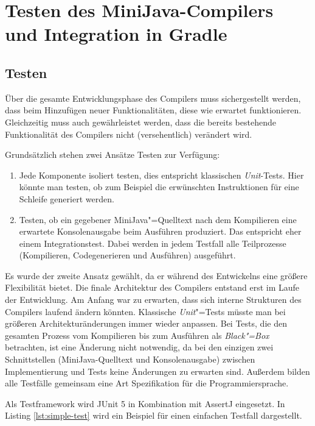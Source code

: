 \chapter{Testen des MiniJava-Compilers und Integration in Gradle}
\label{cha:Testen-des-Compilers}

\section{Testen}

Über die gesamte Entwicklungsphase des Compilers muss sichergestellt werden, dass beim Hinzufügen neuer Funktionalitäten, diese wie erwartet funktionieren. Gleichzeitig muss auch gewährleistet werden, dass die bereits bestehende Funktionalität des Compilers nicht (versehentlich) verändert wird.

Grundsätzlich stehen zwei Ansätze Testen zur Verfügung:
\begin{enumerate}
    \item Jede Komponente isoliert testen, dies entspricht klassischen \emph{Unit}-Tests. Hier könnte man testen, ob zum Beispiel die erwünschten Instruktionen für eine Schleife generiert werden. 
    \item Testen, ob ein gegebener MiniJava"=Quelltext nach dem Kompilieren eine erwartete Konsolenausgabe beim Ausführen produziert. Das entspricht eher einem Integrationstest. Dabei werden in jedem Testfall alle Teilprozesse (Kompilieren, Codegenerieren und Ausführen) ausgeführt.
\end{enumerate}

Es wurde der zweite Ansatz gewählt, da er während des Entwickelns eine größere Flexibilität bietet. Die finale Architektur des Compilers entstand erst im Laufe der Entwicklung. Am Anfang war zu erwarten, dass sich interne Strukturen des Compilers laufend ändern könnten. Klassische \emph{Unit}"=Tests müsste man bei größeren Architekturänderungen immer wieder anpassen. Bei Tests, die den gesamten Prozess vom Kompilieren bis zum Ausführen als \emph{Black"=Box} betrachten, ist eine Änderung nicht notwendig, da bei den einzigen zwei Schnittstellen (MiniJava-Quelltext und Konsolenausgabe) zwischen Implementierung und Tests keine Änderungen zu erwarten sind. Außerdem bilden alle Testfälle gemeinsam eine Art Spezifikation für die Programmiersprache.

Als Testframework wird JUnit 5 \cite{JUnit} in Kombination mit AssertJ \cite{AssertJ} eingesetzt. In Listing \ref{lst:simple-test} wird ein Beispiel für einen einfachen Testfall dargestellt.

